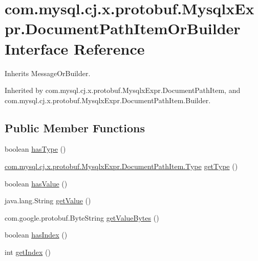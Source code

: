 \hypertarget{interfacecom_1_1mysql_1_1cj_1_1x_1_1protobuf_1_1_mysqlx_expr_1_1_document_path_item_or_builder}{}\section{com.\+mysql.\+cj.\+x.\+protobuf.\+Mysqlx\+Expr.\+Document\+Path\+Item\+Or\+Builder Interface Reference}
\label{interfacecom_1_1mysql_1_1cj_1_1x_1_1protobuf_1_1_mysqlx_expr_1_1_document_path_item_or_builder}


Inherits Message\+Or\+Builder.



Inherited by com.\+mysql.\+cj.\+x.\+protobuf.\+Mysqlx\+Expr.\+Document\+Path\+Item, and com.\+mysql.\+cj.\+x.\+protobuf.\+Mysqlx\+Expr.\+Document\+Path\+Item.\+Builder.

\subsection*{Public Member Functions}
\begin{DoxyCompactItemize}
\item 
boolean \mbox{\hyperlink{interfacecom_1_1mysql_1_1cj_1_1x_1_1protobuf_1_1_mysqlx_expr_1_1_document_path_item_or_builder_a63ad0a2667f54e9eaf84c39a630c411d}{has\+Type}} ()
\item 
\mbox{\hyperlink{enumcom_1_1mysql_1_1cj_1_1x_1_1protobuf_1_1_mysqlx_expr_1_1_document_path_item_1_1_type}{com.\+mysql.\+cj.\+x.\+protobuf.\+Mysqlx\+Expr.\+Document\+Path\+Item.\+Type}} \mbox{\hyperlink{interfacecom_1_1mysql_1_1cj_1_1x_1_1protobuf_1_1_mysqlx_expr_1_1_document_path_item_or_builder_a578be5f25ae84a225cdfbecc1649da4d}{get\+Type}} ()
\item 
boolean \mbox{\hyperlink{interfacecom_1_1mysql_1_1cj_1_1x_1_1protobuf_1_1_mysqlx_expr_1_1_document_path_item_or_builder_a61ea42e0d834a7fa9ac09828c4a14915}{has\+Value}} ()
\item 
java.\+lang.\+String \mbox{\hyperlink{interfacecom_1_1mysql_1_1cj_1_1x_1_1protobuf_1_1_mysqlx_expr_1_1_document_path_item_or_builder_a223a1f7af1612bf156f8a8f6ec1ef72f}{get\+Value}} ()
\item 
com.\+google.\+protobuf.\+Byte\+String \mbox{\hyperlink{interfacecom_1_1mysql_1_1cj_1_1x_1_1protobuf_1_1_mysqlx_expr_1_1_document_path_item_or_builder_a5eb8ddf3b3d6ba14cabccf5392783842}{get\+Value\+Bytes}} ()
\item 
boolean \mbox{\hyperlink{interfacecom_1_1mysql_1_1cj_1_1x_1_1protobuf_1_1_mysqlx_expr_1_1_document_path_item_or_builder_a7c01c9656b84f88ece741e454bb35058}{has\+Index}} ()
\item 
int \mbox{\hyperlink{interfacecom_1_1mysql_1_1cj_1_1x_1_1protobuf_1_1_mysqlx_expr_1_1_document_path_item_or_builder_aede85b2fb038ce74816fd0818c94a69b}{get\+Index}} ()
\end{DoxyCompactItemize}


